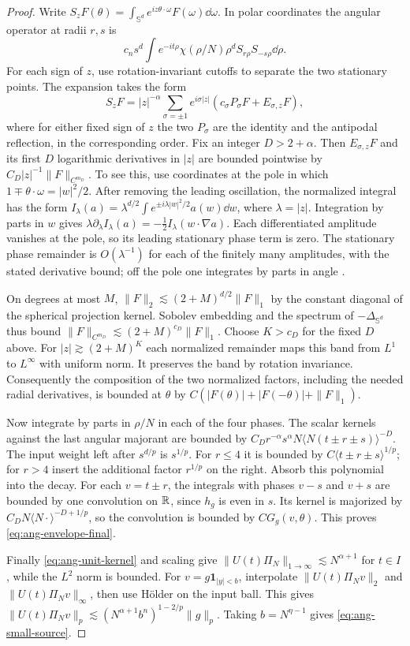 \begin{proof}
Write $S_zF(\theta)=\int_{\mathbb S^d}e^{iz\theta\cdot\omega}
F(\omega)\dd\omega$. In polar coordinates the angular operator at
radii $r,s$ is
\[
 c_n s^d\int e^{-it\rho}\chi(\rho/N)\rho^d S_{r\rho}S_{-s\rho}\dd\rho .
\]
For each sign of $z$, use rotation-invariant cutoffs to separate the
two stationary points. The expansion takes the form
\[
 S_z F=|z|^{-\alpha}\sum_{\sigma=\pm1}e^{i\sigma|z|}
       (c_\sigma P_\sigma F+E_{\sigma,z}F),
\]
where for either fixed sign of $z$ the two $P_\sigma$ are the identity
and the antipodal reflection, in the corresponding order.
Fix an integer $D>2+\alpha$. Then $E_{\sigma,z}F$ and its first $D$
logarithmic derivatives in $|z|$ are bounded pointwise by
$C_D|z|^{-1}\|F\|_{C^{m_D}}$. To see this, use coordinates at the pole
in which $1\mp\theta\cdot\omega=|w|^2/2$. After removing the leading
oscillation, the normalized integral has the form
$I_\lambda(a)=\lambda^{d/2}\int e^{\pm i\lambda|w|^2/2}a(w)\dd w$,
where $\lambda=|z|$. Integration by parts in $w$ gives
$\lambda\partial_\lambda I_\lambda(a)=-\frac12I_\lambda(w\cdot\nabla a)$.
Each differentiated amplitude vanishes at the pole, so its leading
stationary phase term is zero. The stationary phase remainder is
$O(\lambda^{-1})$ for each of the finitely many amplitudes, with the
stated derivative bound; off the pole one integrates by parts in angle
\cite[Chapter VIII, \S2]{Stein1993}.

On degrees at most $M$, $\|F\|_2\lesssim(2+M)^{d/2}\|F\|_1$ by the
constant diagonal of the spherical projection kernel. Sobolev embedding
and the spectrum of $-\Delta_{\mathbb S^d}$ thus bound
$\|F\|_{C^{m_D}}\lesssim(2+M)^{c_D}\|F\|_1$. Choose $K>c_D$ for the fixed $D$ above.
For $|z|\gtrsim(2+M)^K$ each normalized remainder maps this band
from $L^1$ to $L^\infty$ with uniform norm. It preserves the band by
rotation invariance. Consequently the composition of the two normalized
factors, including the needed radial derivatives, is bounded at $\theta$
by $C(|F(\theta)|+|F(-\theta)|+\|F\|_1)$.

Now integrate by parts in $\rho/N$ in each of the four phases.
The scalar kernels against the last angular majorant are bounded by
$C_D r^{-\alpha}s^\alpha N\langle N(t\pm r\pm s)\rangle^{-D}$.
The input weight left after $s^{d/p}$ is $s^{1/p}$. For $r\le4$ it is
bounded by $C\langle t\pm r\pm s\rangle^{1/p}$; for $r>4$ insert the
additional factor $r^{1/p}$ on the right. Absorb this polynomial into the
decay. For each $v=t\pm r$, the integrals with phases $v-s$ and $v+s$
are bounded by one convolution on $\mathbb R$, since $h_g$ is even in $s$.
Its kernel is majorized by $C_D N\langle N\cdot\rangle^{-D+1/p}$, so
the convolution is bounded by $C G_g(v,\theta)$. This proves
\eqref{eq:ang-envelope-final}.

Finally \eqref{eq:ang-unit-kernel} and scaling give
$\|U(t)\Pi_N\|_{1\to\infty}\lesssim N^{\alpha+1}$ for $t\in I$, while
the $L^2$ norm is bounded. For $v=g\mathbf1_{|y|<b}$, interpolate
$\|U(t)\Pi_Nv\|_2$ and $\|U(t)\Pi_Nv\|_\infty$, then use H\"older
on the input ball. This gives
$\|U(t)\Pi_Nv\|_p\lesssim (N^{\alpha+1}b^n)^{1-2/p}\|g\|_p$.
Taking $b=N^{\eta-1}$ gives \eqref{eq:ang-small-source}.
\end{proof}

